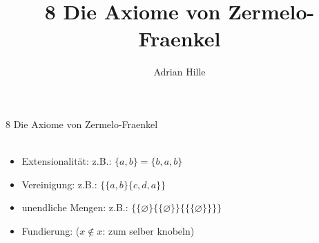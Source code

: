 \documentclass{scrartcl}\usepackage[utf8]{inputenc}
\title{8 Die Axiome von Zermelo-Fraenkel }
\author{Adrian Hille}
\begin{document}
\Large 8 Die Axiome von Zermelo-Fraenkel \\
\\
\normalsize
       \begin{itemize}
    	\item Extensionalit\"at: z.B.: $\{a,b\}=\{b, a, b\}$
	\item Vereinigung: z.B.: $\{ \{a, b\} \{c , d, a\} \}$
	\item unendliche Mengen: z.B.: $\{\{ \varnothing\}\{\{ \varnothing\}\}\{\{\{ \varnothing\}\}\}\}$
	\item Fundierung: ($x \notin x$: zum selber knobeln)
    \end{itemize}
\end{document}
